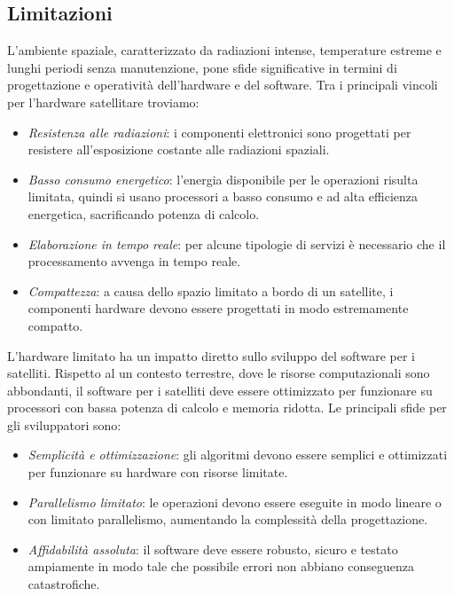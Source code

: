 \subsection{Limitazioni}

L'ambiente spaziale, caratterizzato da radiazioni intense, temperature estreme e lunghi periodi senza manutenzione, pone sfide significative in termini di progettazione e operatività dell'hardware e del software.
Tra i principali vincoli per l'hardware satellitare troviamo:

\begin{itemize}
    \item \textit{Resistenza alle radiazioni}: i componenti elettronici sono progettati per resistere all'esposizione costante alle radiazioni spaziali.
    \item \textit{Basso consumo energetico}: l'energia disponibile per le operazioni risulta limitata, quindi si usano processori a basso consumo e ad alta efficienza energetica, sacrificando potenza di calcolo.
    \item \textit{Elaborazione in tempo reale}: per alcune tipologie di servizi è necessario che il processamento avvenga in tempo reale.
    \item \textit{Compattezza}: a causa dello spazio limitato a bordo di un satellite, i componenti hardware devono essere progettati in modo estremamente compatto.
\end{itemize}

\noindent
L'hardware limitato ha un impatto diretto sullo sviluppo del software per i satelliti. 
Rispetto al un contesto terrestre, dove le risorse computazionali sono abbondanti, il software per i satelliti deve essere ottimizzato per funzionare su processori con bassa potenza di calcolo e memoria ridotta. 
Le principali sfide per gli sviluppatori sono:

\begin{itemize}
    \item \textit{Semplicità e ottimizzazione}: gli algoritmi devono essere semplici e ottimiz\-zati per funzionare su hardware con risorse limitate.
    \item \textit{Parallelismo limitato}: le operazioni devono essere eseguite in modo lineare o con limitato parallelismo, aumentando la complessità della progettazione.
    \item \textit{Affidabilità assoluta}: il software deve essere robusto, sicuro e testato ampiamente in modo tale che possibile errori non abbiano conseguenza catastrofiche.
\end{itemize}

